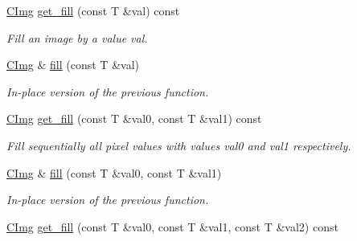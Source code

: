 \begin{DoxyCompactItemize}
\item 
\hyperlink{structcimg__library_1_1_c_img}{C\-Img} \hyperlink{structcimg__library_1_1_c_img_a86ebb8e1e47a5cf932e5eb7073ec63ed}{get\-\_\-fill} (const T \&val) const 
\begin{DoxyCompactList}\small\item\em Fill an image by a value {\ttfamily val}. \end{DoxyCompactList}\item 
\hypertarget{structcimg__library_1_1_c_img_a22c7685eaf6d61e3e25186f702cc89d0}{\hyperlink{structcimg__library_1_1_c_img}{C\-Img} \& \hyperlink{structcimg__library_1_1_c_img_a22c7685eaf6d61e3e25186f702cc89d0}{fill} (const T \&val)}\label{structcimg__library_1_1_c_img_a22c7685eaf6d61e3e25186f702cc89d0}

\begin{DoxyCompactList}\small\item\em In-\/place version of the previous function. \end{DoxyCompactList}\item 
\hypertarget{structcimg__library_1_1_c_img_a964c30366bdc0dc30bad94a9e8a3c3cb}{\hyperlink{structcimg__library_1_1_c_img}{C\-Img} \hyperlink{structcimg__library_1_1_c_img_a964c30366bdc0dc30bad94a9e8a3c3cb}{get\-\_\-fill} (const T \&val0, const T \&val1) const }\label{structcimg__library_1_1_c_img_a964c30366bdc0dc30bad94a9e8a3c3cb}

\begin{DoxyCompactList}\small\item\em Fill sequentially all pixel values with values {\itshape val0} and {\itshape val1} respectively. \end{DoxyCompactList}\item 
\hypertarget{structcimg__library_1_1_c_img_a37dff69737b46ebe38ef21df83ff283c}{\hyperlink{structcimg__library_1_1_c_img}{C\-Img} \& \hyperlink{structcimg__library_1_1_c_img_a37dff69737b46ebe38ef21df83ff283c}{fill} (const T \&val0, const T \&val1)}\label{structcimg__library_1_1_c_img_a37dff69737b46ebe38ef21df83ff283c}

\begin{DoxyCompactList}\small\item\em In-\/place version of the previous function. \end{DoxyCompactList}\item 
\hypertarget{structcimg__library_1_1_c_img_a4576fe753a1e12d75c8cf5c32686688b}{\hyperlink{structcimg__library_1_1_c_img}{C\-Img} \hyperlink{structcimg__library_1_1_c_img_a4576fe753a1e12d75c8cf5c32686688b}{get\-\_\-fill} (const T \&val0, const T \&val1, const T \&val2) const }\label{structcimg__library_1_1_c_img_a4576fe753a1e12d75c8cf5c32686688b}


\end{DoxyCompactItemize}
